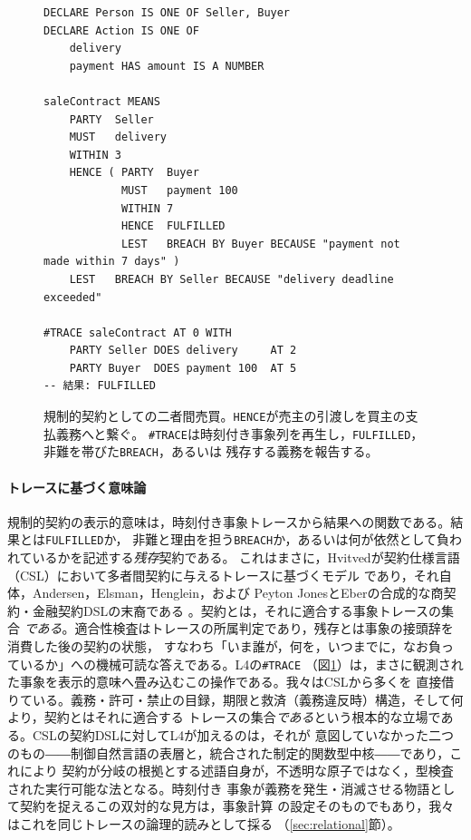 \documentclass[11pt,a4paper]{ltjsarticle}
\newcommand{\code}[1]{\texttt{\small #1}}
\begin{document}
\begin{figure}[t]
\begin{lstlisting}
DECLARE Person IS ONE OF Seller, Buyer
DECLARE Action IS ONE OF
    delivery
    payment HAS amount IS A NUMBER

saleContract MEANS
    PARTY  Seller
    MUST   delivery
    WITHIN 3
    HENCE ( PARTY  Buyer
            MUST   payment 100
            WITHIN 7
            HENCE  FULFILLED
            LEST   BREACH BY Buyer BECAUSE "payment not made within 7 days" )
    LEST   BREACH BY Seller BECAUSE "delivery deadline exceeded"

#TRACE saleContract AT 0 WITH
    PARTY Seller DOES delivery     AT 2
    PARTY Buyer  DOES payment 100  AT 5
-- 結果: FULFILLED
\end{lstlisting}
\caption{規制的契約としての二者間売買。\code{HENCE}が売主の引渡しを買主の支払義務へと繋ぐ。
\code{\#TRACE}は時刻付き事象列を再生し，\code{FULFILLED}，非難を帯びた\code{BREACH}，あるいは
残存する義務を報告する。}
\label{fig:sale}
\end{figure}

\paragraph{トレースに基づく意味論}
規制的契約の表示的意味は，時刻付き事象トレースから結果への関数である。結果とは\code{FULFILLED}か，
非難と理由を担う\code{BREACH}か，あるいは何が依然として負われているかを記述する\emph{残存}契約である。
これはまさに，Hvitvedが契約仕様言語（CSL）において多者間契約に与えるトレースに基づくモデル
\cite{hvitved2011thesis,hvitved2012trace}であり，それ自体，Andersen，Elsman，Henglein，および
Peyton JonesとEberの合成的な商契約・金融契約DSLの末裔である
\cite{andersen2006compositional,pjeber2000composing}。契約とは，それに適合する事象トレースの集合
\emph{である}。適合性検査はトレースの所属判定であり，残存とは事象の接頭辞を消費した後の契約の状態，
すなわち「いま誰が，何を，いつまでに，なお負っているか」への機械可読な答えである。L4の\code{\#TRACE}
（図\ref{fig:sale}）は，まさに観測された事象を表示的意味へ畳み込むこの操作である。我々はCSLから多くを
直接借りている。義務・許可・禁止の目録，期限と救済（義務違反時）構造，そして何より，契約とはそれに適合する
トレースの集合\emph{である}という根本的な立場である。CSLの契約DSLに対してL4が加えるのは，それが
意図していなかった二つのもの――制御自然言語の表層と，統合された制定的関数型中核――であり，これにより
契約が分岐の根拠とする述語自身が，不透明な原子ではなく，型検査された実行可能な法となる。時刻付き
事象が義務を発生・消滅させる物語として契約を捉えるこの双対的な見方は，事象計算
\cite{kowalski1986events}の設定そのものでもあり，我々はこれを同じトレースの論理的読みとして採る
（\ref{sec:relational}節）。
\end{document}
